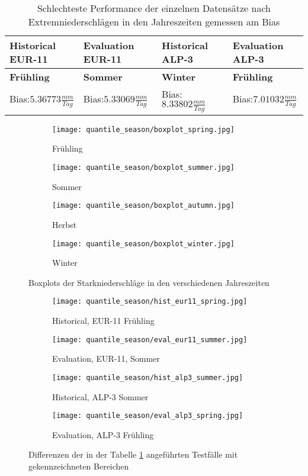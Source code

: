 \begin{table}[h]
	\begin{tabularx}{\textwidth}{|X|X|X|X|}
		\hline
		\textbf{Historical EUR-11} & \textbf{Evaluation EUR-11}& \textbf{Historical ALP-3} & \textbf{Evaluation ALP-3}\\
		\hline
		\textbf{Frühling}  & \textbf{Sommer}  & \textbf{Winter} & \textbf{Frühling} \\
		Bias:$5.36773\frac{mm}{Tag}$& Bias:$5.33069\frac{mm}{Tag}$ & Bias:$8.33802\frac{mm}{Tag}$ & Bias:$7.01032\frac{mm}{Tag}$\\
		\hline
	\end{tabularx}
	\caption{Schlechteste Performance der einzelnen Datensätze nach Extremniederschlägen in den Jahreszeiten gemessen am Bias}
	\label{tab:season_dataset}
\end{table}
\begin{figure}
	\begin{subfigure}{0.49\textwidth}
		\texttt{[image: quantile\_season/boxplot\_spring.jpg]}
		\caption{Frühling}
	\end{subfigure}
	\begin{subfigure}{0.49\textwidth}
		\texttt{[image: quantile\_season/boxplot\_summer.jpg]}
		\caption{Sommer}
	\end{subfigure}
	\begin{subfigure}{0.49\textwidth}
		\texttt{[image: quantile\_season/boxplot\_autumn.jpg]}
		\caption{Herbst}
	\end{subfigure}
	\begin{subfigure}{0.49\textwidth}
		\texttt{[image: quantile\_season/boxplot\_winter.jpg]}
		\caption{Winter}
	\end{subfigure}
	\caption{Boxplots der Starkniederschläge in den verschiedenen Jahreszeiten}
	\label{fig:seasons_boxplots}
\end{figure}
\begin{figure}
	\begin{subfigure}{0.49\textwidth}
		\texttt{[image: quantile\_season/hist\_eur11\_spring.jpg]}
		\caption{Historical, EUR-11 Frühling}
		\label{fig:seasons_dif:hist_eur11}
	\end{subfigure}
	\begin{subfigure}{0.49\textwidth}
		\texttt{[image: quantile\_season/eval\_eur11\_summer.jpg]}
		\caption{Evaluation, EUR-11, Sommer}
		\label{fig:seasons_dif:eval_eur_11}
	\end{subfigure}
	\begin{subfigure}{0.49\textwidth}
		\texttt{[image: quantile\_season/hist\_alp3\_summer.jpg]}
		\caption{Historical, ALP-3 Sommer}
		\label{fig:seasons_dif:hist_alp3}
	\end{subfigure}
	\begin{subfigure}{0.49\textwidth}
		\texttt{[image: quantile\_season/eval\_alp3\_spring.jpg]}
		\caption{Evaluation, ALP-3 Frühling}
	\end{subfigure}
	\caption{Differenzen der in der Tabelle \ref{tab:season_dataset} angeführten Testfälle mit gekennzeichneten Bereichen}
	\label{fig:seasons_dif}
\end{figure} \newpage
